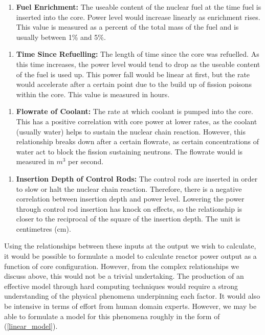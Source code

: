 \begin{enumerate} [label=$x_1$]
	
	\item \textbf{Fuel Enrichment:} The useable content of the nuclear fuel at the time fuel is inserted into the core. Power level would increase linearly as enrichment rises. This value is measured as a percent of the total mass of the fuel and is usually between 1\% and 5\%.
	 

\end{enumerate}

\begin{enumerate} [label=$x_2$]
	
		\item \textbf{Time Since Refuelling:} The length of time since the core was refuelled. As this time increases, the power level would tend to drop as the useable content of the fuel is used up. This power fall would be linear at first, but the rate would accelerate  after a certain point due to the build up of fission poisons within the core. This value is measured in hours.

\end{enumerate}

\begin{enumerate} [label=$x_3$]
		
	\item  \textbf{Flowrate of Coolant:} The rate at which coolant is pumped into the core. This has a positive correlation with core power at lower rates, as the coolant (usually water) helps to sustain the nuclear chain reaction. However, this relationship breaks down after a certain flowrate, as certain concentrations of water act to block the fission sustaining neutrons. The flowrate would  is measured in $m^3$ per second.

\end{enumerate}

\begin{enumerate} [label=$x_4$]
	
	\item \textbf{Insertion Depth of Control Rods:} The control rods are inserted in order to slow or halt the nuclear chain reaction. Therefore, there is a negative correlation between insertion depth and power level. Lowering the power through control rod insertion has knock on effects, so the relationship is closer to the reciprocal of the square of the insertion depth. The unit is centimetres (cm). 
	
\end{enumerate}
\noindent
Using the relationships between these inputs at the output we wish to calculate, it would be possible to formulate a model to calculate reactor power output as a function of core configuration. However, from the complex relationships we discuss above, this would not be a trivial undertaking. The production of an effective model through hard computing techniques would require a strong understanding of the physical phenomena underpinning each factor. It would also be intensive in terms of effort from human domain experts. However, we may be able to formulate a model for this phenomena roughly in the form of (\ref{linear_model}). \\

